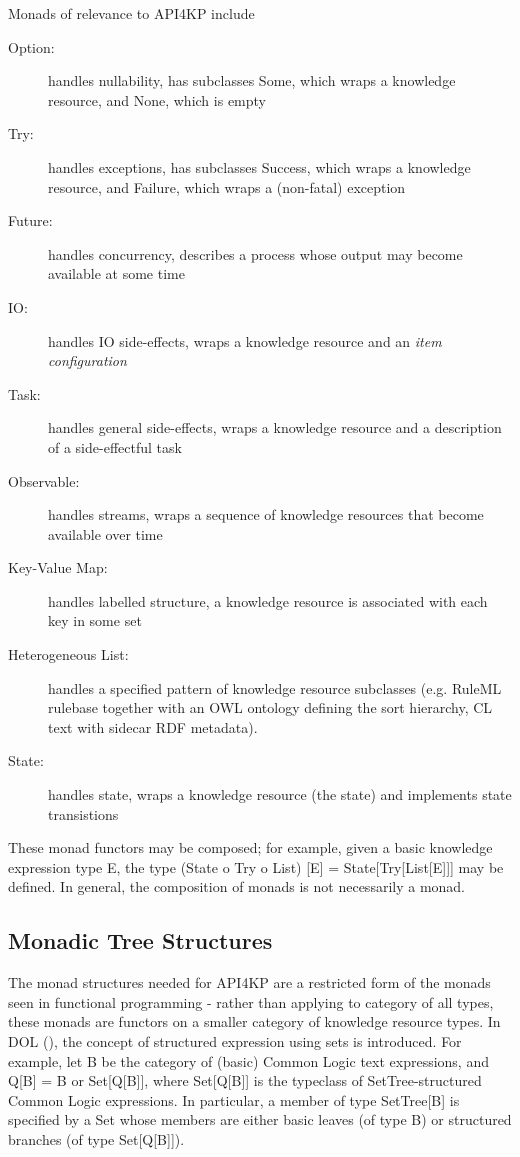 \documentclass[runningheads]{llncs}
\begin{document}
Monads of relevance to API4KP include
\begin{description}
\item [Option:] handles nullability, has subclasses Some, which wraps a knowledge resource, and None, which is empty
\item [Try:] handles exceptions, has subclasses Success, which wraps a knowledge resource, and Failure, which wraps a (non-fatal) exception
\item [Future:] handles concurrency, describes a process whose output may become available at some time
\item [IO:] handles IO side-effects, wraps a knowledge resource and an \emph{item configuration}
\item [Task:] handles general side-effects, wraps a knowledge resource and a description of a side-effectful task
\item [Observable:] handles streams, wraps a sequence of knowledge resources that become available over time
\item [Key-Value Map:] handles labelled structure, a knowledge resource is associated with each key in some set
\item [Heterogeneous List:] handles a specified pattern of knowledge resource subclasses (e.g. RuleML rulebase together with an OWL ontology defining the sort hierarchy, CL text with sidecar RDF metadata).
\item [State:] handles state, wraps a knowledge resource (the state) and implements state transistions
\end{description}
These monad functors may be composed; for example, given a basic knowledge expression type E, the type (State o Try o List) [E] = State[Try[List[E]]] may be defined.
In general, the composition of monads is not necessarily a monad. 



\subsection{Monadic Tree Structures}
The monad structures needed for API4KP are a restricted form of the monads seen in functional programming - rather than applying to category of all types, these monads are functors on a smaller category of knowledge resource types. In DOL (), the concept of structured expression using sets is introduced. For example, let B be the category of (basic) Common Logic text expressions, and Q[B] = B or Set[Q[B]], where Set[Q[B]] is the typeclass of SetTree-structured Common Logic expressions. In particular, a member of type SetTree[B] is specified by a Set whose members are either  basic leaves (of type B) or structured branches (of type Set[Q[B]]). 
\end{document}
